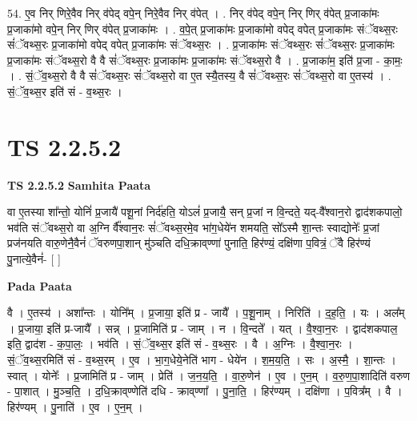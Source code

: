 \documentclass[17pt]{extarticle}
\begin{document}
54. ए॒व निर् णिरे॒वैव निर् व॑पेद् वपे॒न् निरे॒वैव निर् व॑पेत् । . निर् व॑पेद् वपे॒न् निर् णिर् व॑पेत् प्र॒जाका॑मः प्र॒जाका॑मो वपे॒न् निर् णिर् व॑पेत् प्र॒जाका॑मः । . व॒पे॒त् प्र॒जाका॑मः प्र॒जाका॑मो वपेद् वपेत् प्र॒जाका॑मः संॅवथ्स॒रः सं॑ॅवथ्स॒रः प्र॒जाका॑मो वपेद् वपेत् प्र॒जाका॑मः संॅवथ्स॒रः । . प्र॒जाका॑मः संॅवथ्स॒रः सं॑ॅवथ्स॒रः प्र॒जाका॑मः प्र॒जाका॑मः संॅवथ्स॒रो वै वै सं॑ॅवथ्स॒रः प्र॒जाका॑मः प्र॒जाका॑मः संॅवथ्स॒रो वै । . प्र॒जाका॑म॒ इति॑ प्र॒जा - का॒मः॒ । . सं॒ॅव॒थ्स॒रो वै वै सं॑ॅवथ्स॒रः सं॑ॅवथ्स॒रो वा ए॒त स्यै॒तस्य॒ वै सं॑ॅवथ्स॒रः सं॑ॅवथ्स॒रो वा ए॒तस्य॑ । . सं॒ॅव॒थ्स॒र इति॑ सं - व॒थ्स॒रः । \newline
\pagebreak
{}

\section{ TS 2.2.5.2 }

\textbf{TS 2.2.5.2 } \newline
\textbf{Samhita Paata} \newline

वा ए॒तस्या शा᳚न्तो॒ योनिं॑ प्र॒जायै॑ पशू॒नां निर्द॑हति॒ योऽलं॑ प्र॒जायै॒ सन् प्र॒जां न वि॒न्दते॒ यद्-वै᳚श्वान॒रो द्वाद॑शकपालो॒ भव॑ति संॅवथ्स॒रो वा अ॒ग्नि र्वै᳚श्वान॒रः सं॑ॅवथ्स॒रमे॒व भा॑ग॒धेये॑न शमयति॒ सो᳚ऽस्मै शा॒न्तः स्वाद्योनेः᳚ प्र॒जां प्रज॑नयति वारु॒णेनै॒वैनं॑ ॅवरुणपा॒शान् मु॑ञ्चति दधि॒क्राव्‌ण्णा॑ पुनाति॒ हिर॑ण्यं॒ दक्षि॑णा प॒वित्रं॒ ॅवै हिर॑ण्यं पु॒नात्ये॒वैनं॑- [  ] \newline

\textbf{Pada Paata} \newline

वै । ए॒तस्य॑ । अशा᳚न्तः । योनि᳚म् । प्र॒जाया॒ इति॑ प्र - जायै᳚ । प॒शू॒नाम् । निरिति॑ । द॒ह॒ति॒ । यः । अल᳚म् । प्र॒जाया॒ इति॑ प्र-जायै᳚ । सन्न् । प्र॒जामिति॑ प्र - जाम् । न । वि॒न्दते᳚ । यत् । वै॒श्वा॒न॒रः । द्वाद॑शकपाल॒ इति॒ द्वाद॑श - क॒पा॒लः॒ । भव॑ति । सं॒ॅव॒थ्स॒र इति॑ सं - व॒थ्स॒रः । वै । अ॒ग्निः । वै॒श्वा॒न॒रः । सं॒ॅव॒थ्स॒रमिति॑ सं - व॒थ्स॒रम् । ए॒व । भा॒ग॒धेये॒नेति॑ भाग - धेये॑न । श॒म॒य॒ति॒ । सः । अ॒स्मै॒ । शा॒न्तः । स्वात् । योनेः᳚ । प्र॒जामिति॑ प्र - जाम् । प्रेति॑ । ज॒न॒य॒ति॒ । वा॒रु॒णेन॑ । ए॒व । ए॒न॒म् । व॒रु॒ण॒पा॒शादिति॑ वरुण - पा॒शात् । मु॒ञ्च॒ति॒ । द॒धि॒क्राव्‌ण्णेति॑ दधि - क्राव्‌ण्णा᳚ । पु॒ना॒ति॒ । हिर॑ण्यम् । दक्षि॑णा । प॒वित्र᳚म् । वै । हिर॑ण्यम् । पु॒नाति॑ । ए॒व । ए॒न॒म् ।  \newline
\end{document}
